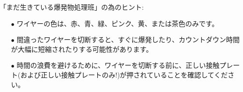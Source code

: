 \vspace*{2em}

「まだ生きている爆発物処理班」の為のヒント:
\begin{itemize}
    \item[$\bullet$] ワイヤーの色は、赤、青、緑、ピンク、黄、または茶色のみです。
    \item[$\bullet$] 間違ったワイヤーを切断すると、すぐに爆発したり、カウントダウン時間が大幅に短縮されたりする可能性があります。
    \item[$\bullet$] 時間の浪費を避けるために、ワイヤーを切断する前に、正しい接触プレート(および正しい接触プレートのみ!)が押されていることを確認してください。
\end{itemize}

